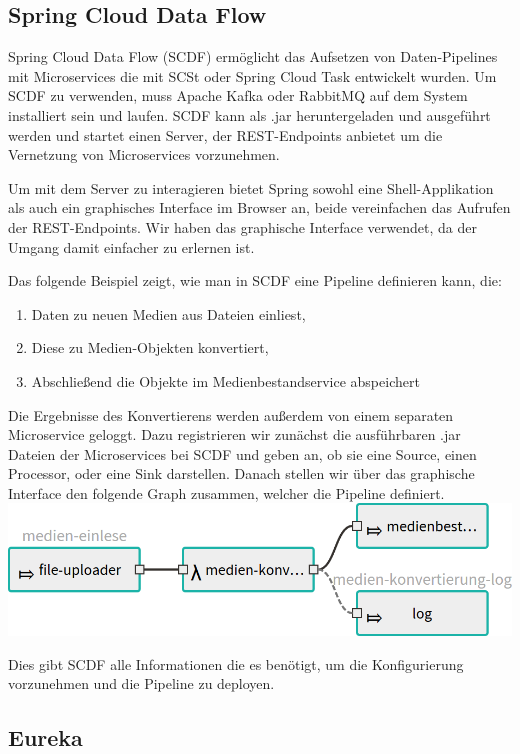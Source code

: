 \documentclass{article}
\begin{document}
\subsection{Spring Cloud Data Flow}

Spring Cloud Data Flow (SCDF) ermöglicht das Aufsetzen von Daten-Pipelines mit Microservices die mit SCSt oder Spring Cloud Task entwickelt wurden.
Um SCDF zu verwenden, muss Apache Kafka oder RabbitMQ auf dem System installiert sein und laufen.
SCDF kann als .jar heruntergeladen und ausgeführt werden und startet einen Server, der REST-Endpoints anbietet um die Vernetzung von Microservices vorzunehmen.

Um mit dem Server zu interagieren bietet Spring sowohl eine Shell-Applikation als auch ein graphisches Interface im Browser an, beide vereinfachen das Aufrufen der REST-Endpoints.
Wir haben das graphische Interface verwendet, da der Umgang damit einfacher zu erlernen ist.

Das folgende Beispiel zeigt, wie man in SCDF eine Pipeline definieren kann, die:
\begin{enumerate}
\item Daten zu neuen Medien aus Dateien einliest,
\item Diese zu Medien-Objekten konvertiert,
\item Abschließend die Objekte im Medienbestandservice abspeichert
\end{enumerate}
Die Ergebnisse des Konvertierens werden außerdem von einem separaten Microservice geloggt.
Dazu registrieren wir zunächst die ausführbaren .jar Dateien der Microservices bei SCDF und geben an, ob sie eine Source, einen Processor, oder eine Sink darstellen.
Danach stellen wir über das graphische Interface den folgende Graph zusammen, welcher die Pipeline definiert.\medskip\\
\includegraphics[width=\textwidth]{stream-small.png}

Dies gibt SCDF alle Informationen die es benötigt, um die Konfigurierung vorzunehmen und die Pipeline zu deployen.

\subsection{Eureka}
\end{document}
